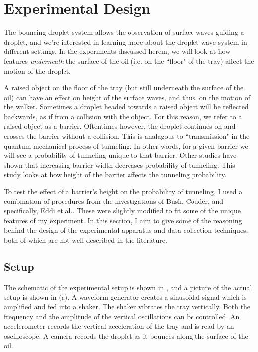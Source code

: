 \chapter{Experimental Design}

The bouncing droplet system allows the observation of surface waves guiding a droplet, and we're interested in learning more about the droplet-wave system in different settings. In the experiments discussed herein, we will look at how features \textit{underneath} the surface of the oil (i.e. on the ``floor" of the tray) affect the motion of the droplet. 

A raised object on the floor of the tray (but still underneath the surface of the oil) can have an effect on height of the surface waves, and thus, on the motion of the walker. Sometimes a droplet headed towards a raised object will be reflected backwards, as if from a collision with the object. For this reason, we refer to a raised object as a barrier. Oftentimes however, the droplet continues on and crosses the barrier without a collision. This is analagous to ``transmission" in the quantum mechanical process of tunneling. In other words, for a given barrier we will see a probability of tunneling unique to that barrier. Other studies have shown that increasing barrier width decreases probability of tunneling. This study looks at how height of the barrier affects the tunneling probability. 

To test the effect of a barrier's height on the probability of tunneling, I used a combination of procedures from the investigations of Bush, Couder, and specifically, Eddi et al.. These were slightly modified to fit some of the unique features of my experiment. In this section, I aim to give some of the reasoning behind the  design of the experimental apparatus and data collection techniques, both of which are not well described in the literature.

\section{Setup}
    The schematic of the experimental setup is shown in , and a picture of the actual setup is shown in (a). A waveform generator creates a sinusoidal signal which is amplified and fed into a shaker. The shaker vibrates the tray vertically. Both the frequency and the amplitude of the vertical oscillations can be controlled. An accelerometer records the vertical acceleration of the tray and is read by an oscilloscope. A camera records the droplet as it bounces along the surface of the oil.  
    
